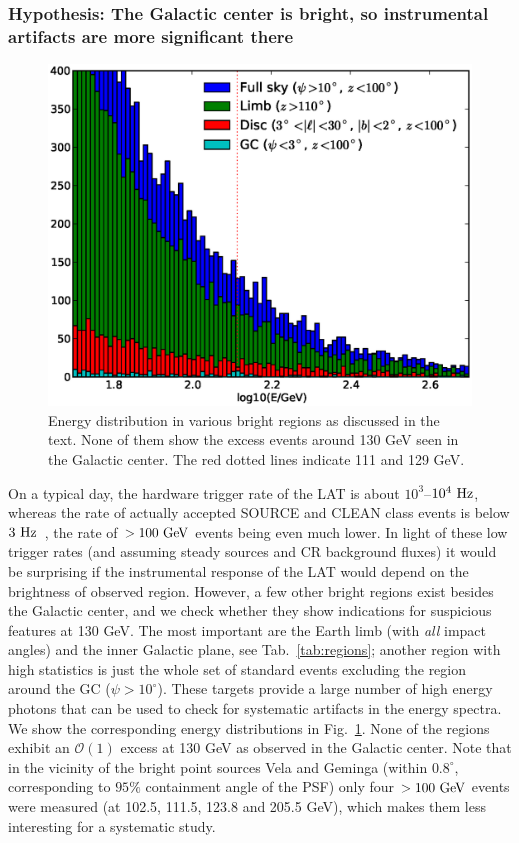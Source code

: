 \documentclass[aps,twocolumn,prd,superscriptaddress,showpacs,nofootinbib,fixfloat]{revtex4}
\newcommand{\Hz}{{\rm ~Hz}}
\newcommand{\GeV}{{\rm ~GeV}}
\begin{document}
\subsubsection{Hypothesis: The Galactic center is bright, so
instrumental artifacts are more significant there}

\begin{figure}
  \centering
  \includegraphics[width=1.0\linewidth]{plots/target_spectra.eps}
  \caption{Energy distribution in various bright regions as
  discussed in the text. None of them show the excess events
  around 130 GeV seen in the Galactic center. The red dotted
  lines indicate 111 and 129 GeV.}
  \label{fig:target_spectra}
\end{figure}

On a typical day, the hardware trigger rate of the LAT is
about $10^3$--$10^4\Hz$, whereas the rate of actually
accepted SOURCE and CLEAN class events is below
$3\Hz$~\citep{1206.1896}, the rate of $>100\GeV$ events
being even much lower. In light of these low trigger rates
(and assuming steady sources and CR background fluxes) it
would be surprising if the instrumental response of the LAT
would depend on the brightness of observed region.  However,
a few other bright regions exist besides the Galactic
center, and we check whether they show indications for
suspicious features at 130 GeV. The most important are the
Earth limb (with \emph{all} impact angles) and the inner
Galactic plane, see Tab.~\ref{tab:regions}; another region
with high statistics is just the whole set of standard
events excluding the region around the GC ($\psi>10^\circ$).
These targets provide a large number of high energy photons
that can be used to check for systematic artifacts in the
energy spectra.  We show the corresponding energy
distributions in Fig.~\ref{fig:target_spectra}. None of the
regions exhibit an $\mathcal{O}(1)$ excess at 130 GeV as
observed in the Galactic center. Note that in the vicinity
of the bright point sources Vela and Geminga (within
$0.8^\circ$, corresponding to $95\%$ containment angle of
the PSF) only four $>100\GeV$ events were measured (at
102.5, 111.5, 123.8 and 205.5 GeV), which makes them less
interesting for a systematic study.
\end{document}
